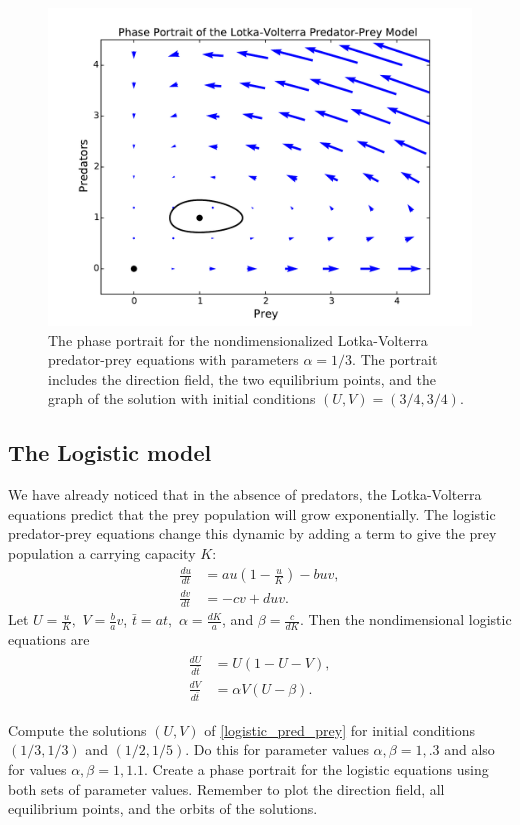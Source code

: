 \begin{figure}
\centering
\includegraphics[width=\textwidth]{Lotka_Volterra_Phase_Portrait.pdf}
\caption{The phase portrait for the nondimensionalized Lotka-Volterra predator-prey equations with parameters $\alpha = 1/3$.
The portrait includes the direction field, the two equilibrium points, and the graph of the solution with initial conditions $(U,V) = (3/4, 3/4)$. }
\label{fig:pred-prey_Lotka_Voterra_Phase_Portrait}
\end{figure}

\subsection*{The Logistic model}
We have already noticed that in the absence of predators, the Lotka-Volterra equations predict that the prey population will grow exponentially.
The logistic predator-prey equations change this dynamic by adding a term to give the prey population a carrying capacity $K$:
\begin{align*}
	\frac{du}{dt} &= au\left(1 -\frac{u}{K}\right) - buv,\\
	\frac{dv}{dt} &= -cv + duv.
\end{align*}
Let $U = \frac{u}{K},$ $V = \frac{b}{a}v$, $\bar{t} = at,$  $\alpha = \frac{dK}{a}$, and $\beta = \frac{c}{dK}$.
Then the nondimensional logistic equations are
\begin{align}
	\begin{split}
	\frac{dU}{d\bar{t}} &= U(1-U-V),\\
	\frac{dV}{d\bar{t}} &= \alpha V (U-\beta).
	\end{split} \label{logistic_pred_prey}
\end{align}

\begin{problem}
Compute the solutions $(U,V)$ of \eqref{logistic_pred_prey}
for initial conditions $(1/3, 1/3)$ and $(1/2, 1/5)$.
Do this for parameter values $\alpha, \beta = 1, .3$ and also for values $\alpha, \beta = 1, 1.1$.
Create a phase portrait for the logistic equations using both sets of parameter values.
Remember to plot the direction field, all equilibrium points, and the orbits of the solutions.
\end{problem} 